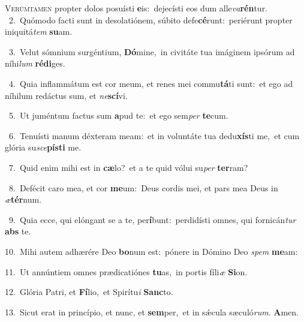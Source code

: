 \lettrine{\initial\textcolor{\initialcolor}{V}}{erúmtamen} propter dolos posuísti \textbf{e}\-is:~\star dejecísti eos dum alle\-\textit{va}\-\textbf{rén}tur.\\
{\numbfont\textcolor{\numbcolor}{~2.}}~Quómodo facti sunt in desolatiónem, súbito defe\-\textbf{cé}\-runt:~\star periérunt propter iniquitá\textit{tem} \textbf{su}\-am.\par
{\numbfont\textcolor{\numbcolor}{~3.}}~Velut sómnium surgéntium, \textbf{Dó}\-mine,~\star in civitáte tua imáginem ipsórum ad níhi\textit{lum} \textbf{réd}\-\textbf{i}ges.\par
{\numbfont\textcolor{\numbcolor}{~4.}}~Quia inflammátum est cor meum, et renes mei commu\-\textbf{tá}\-ti sunt:~\star et ego ad níhilum redáctus sum, et \textit{ne}\-\textbf{scí}vi.\par
{\numbfont\textcolor{\numbcolor}{~5.}}~Ut juméntum factus sum \textbf{a}\-pud te:~\star et ego sem\textit{per} \textbf{te}\-cum.\par
{\numbfont\textcolor{\numbcolor}{~6.}}~Tenuísti manum déxteram meam:~\dagger et in voluntáte tua dedu\-\textbf{xís}\-ti me,~\star et cum glória su\-\textit{sce}\-\textbf{pís}\textbf{ti} me.\par
{\numbfont\textcolor{\numbcolor}{~7.}}~Quid enim mihi est in \textbf{cæ}\-lo?~\star et a te quid vólui su\textit{per} \textbf{ter}\-ram?\par
{\numbfont\textcolor{\numbcolor}{~8.}}~Defécit caro mea, et cor \textbf{me}\-um:~\star Deus cordis mei, et pars mea Deus in \textit{æ}\-\textbf{tér}num.\par
{\numbfont\textcolor{\numbcolor}{~9.}}~Quia ecce, qui elóngant se a te, per\-\textbf{í}\-bunt:~\star perdidísti omnes, qui fornicán\textit{tur} \textbf{abs} te.\par
{\numbfont\textcolor{\numbcolor}{10.}}~Mihi autem adhærére Deo \textbf{bo}\-num est:~\star pónere in Dómino Deo \textit{spem} \textbf{me}\-am:\par
{\numbfont\textcolor{\numbcolor}{11.}}~Ut annúntiem omnes prædicatiónes \textbf{tu}\-as,~\star in portis fíli\textit{æ} \textbf{Si}\-on.\par
{\numbfont\textcolor{\numbcolor}{12.}}~Glória Patri, et \textbf{Fí}\-lio,~\star et Spirítu\textit{i} \textbf{Sanc}\-to.\par
{\numbfont\textcolor{\numbcolor}{13.}}~Sicut erat in princípio, et nunc, et \textbf{sem}\-per,~\star et in sǽcula sæculó\-\textit{rum}\-. \textbf{A}\-men.\par
